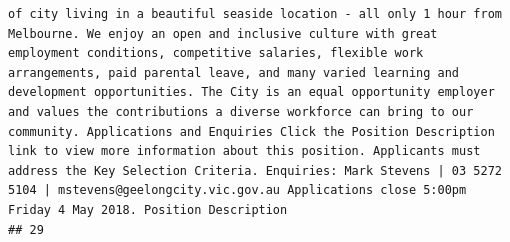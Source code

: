 \documentclass[11pt,a4paper,]{article}
\begin{document}
\begin{verbatim}
of city living in a beautiful seaside location - all only 1 hour from Melbourne. We enjoy an open and inclusive culture with great employment conditions, competitive salaries, flexible work arrangements, paid parental leave, and many varied learning and development opportunities. The City is an equal opportunity employer and values the contributions a diverse workforce can bring to our community. Applications and Enquiries Click the Position Description link to view more information about this position. Applicants must address the Key Selection Criteria. Enquiries: Mark Stevens | 03 5272 5104 | mstevens@geelongcity.vic.gov.au Applications close 5:00pm Friday 4 May 2018. Position Description    
## 29                                                                                                                                                                                                                                                                                                                                                                                                                                                                                                                                                                                                                                                                                                                                                                                                                                                                                                                                                                                                                                                                                                                                                                                                                                                                                                                                                                                                                                                                                                                                                                                                                                                                                                                                                                                                                                                                                                                                                                                                                                                                                                                                                                                                                                                                                                                                                                                                                                                                                                                                                                                                                                                                                                                  
\end{verbatim}
\end{document}
